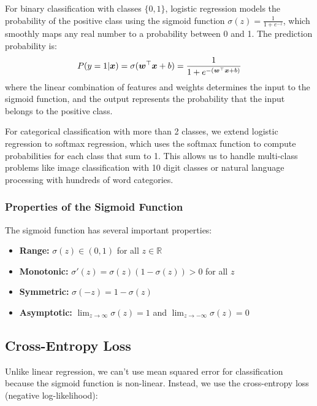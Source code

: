 For binary classification with classes $\{0, 1\}$, logistic regression models the probability of the positive class using the sigmoid function $\sigma(z) = \frac{1}{1 + e^{-z}}$, which smoothly maps any real number to a probability between 0 and 1. The prediction probability is:
\begin{equation}
P(y=1|\boldsymbol{x}) = \sigma(\boldsymbol{w}^\top \boldsymbol{x} + b) = \frac{1}{1 + e^{-(\boldsymbol{w}^\top \boldsymbol{x} + b)}}
\end{equation}
where the linear combination of features and weights determines the input to the sigmoid function, and the output represents the probability that the input belongs to the positive class.

\begin{remark}
For categorical classification with more than 2 classes, we extend logistic regression to softmax regression, which uses the softmax function to compute probabilities for each class that sum to 1. This allows us to handle multi-class problems like image classification with 10 digit classes or natural language processing with hundreds of word categories.
\end{remark}

\subsubsection{Properties of the Sigmoid Function}

The sigmoid function has several important properties:
\begin{itemize}
    \item \textbf{Range:} $\sigma(z) \in (0, 1)$ for all $z \in \mathbb{R}$
    \item \textbf{Monotonic:} $\sigma'(z) = \sigma(z)(1-\sigma(z)) > 0$ for all $z$
    \item \textbf{Symmetric:} $\sigma(-z) = 1 - \sigma(z)$
    \item \textbf{Asymptotic:} $\lim_{z \to \infty} \sigma(z) = 1$ and $\lim_{z \to -\infty} \sigma(z) = 0$
\end{itemize}

\subsection{Cross-Entropy Loss}

Unlike linear regression, we can't use mean squared error for classification because the sigmoid function is non-linear. Instead, we use the cross-entropy loss (negative log-likelihood):

